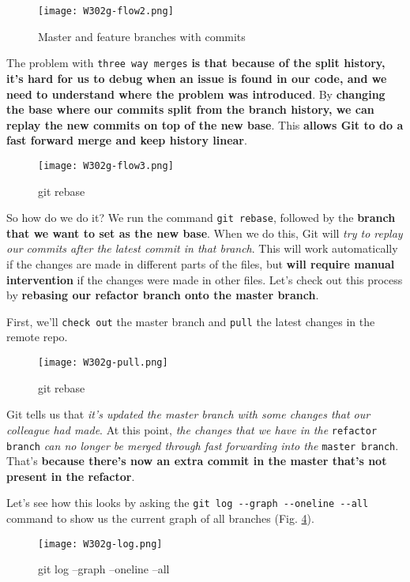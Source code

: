 	\begin{figure} 
		\caption{Master and feature branches with commits}
		\centering
		\texttt{[image: W302g-flow2.png]}
		\label{W302g-flow2}
	\end{figure}
	
	The problem with \verb|three way merges|\textbf{ is that because of the split history, it's hard for us to debug when an issue is found in our code, and we need to understand where the problem was introduced}. By \textbf{changing the base where our commits split from the branch history, we can replay the new commits on top of the new base}. This \textbf{allows Git to do a fast forward merge and keep history linear}.
	
	\begin{figure} 
		\caption{git rebase}
		\centering
		\texttt{[image: W302g-flow3.png]}
		\label{W302g-flow3}
	\end{figure}
	
	
	So how do we do it? We run the command \verb|git rebase|, followed by the \textbf{branch that we want to set as the new base}. When we do this, Git will \textit{try to replay our commits after the latest commit in that branch}. This will work automatically if the changes are made in different parts of the files, but \textbf{will require manual intervention} if the changes were made in other files.
	Let's check out this process by \textbf{rebasing our refactor branch onto the master branch}. 
	
	First, we'll \verb|check out| the master branch and \verb|pull| the latest changes in the remote repo.
	
	\begin{figure} 
		\caption{git rebase}
		\centering
		\texttt{[image: W302g-pull.png]}
		\label{W302g-pull}
	\end{figure}
	
	
	Git tells us that \textit{it's updated the master branch with some changes that our colleague had made}. At this point, \textit{the changes that we have in the} \verb|refactor branch| \textit{can no longer be merged through fast forwarding into the} \verb|master branch|. That's \textbf{because there's now an extra commit in the master that's not present in the refactor}.
	
	Let's see how this looks by asking the \verb|git log --graph --oneline --all| command to show us the current graph of all branches (Fig. \ref{W302g-log}).
	
	\begin{figure} 
		\caption{git log --graph --oneline --all}
		\centering
		\texttt{[image: W302g-log.png]}
		\label{W302g-log}
	\end{figure}
	

